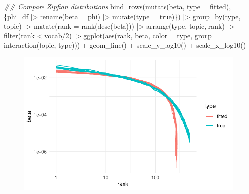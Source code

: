 \documentclass[
]{article}
\newenvironment{Shaded}{\begin{snugshade}}{\end{snugshade}}
\newcommand{\AttributeTok}[1]{\textcolor[rgb]{0.40,0.45,0.13}{#1}}
\newcommand{\DecValTok}[1]{\textcolor[rgb]{0.68,0.00,0.00}{#1}}
\newcommand{\DocumentationTok}[1]{\textcolor[rgb]{0.37,0.37,0.37}{\textit{#1}}}
\newcommand{\FunctionTok}[1]{\textcolor[rgb]{0.28,0.35,0.67}{#1}}
\newcommand{\NormalTok}[1]{\textcolor[rgb]{0.00,0.23,0.31}{#1}}
\newcommand{\SpecialCharTok}[1]{\textcolor[rgb]{0.37,0.37,0.37}{#1}}
\newcommand{\StringTok}[1]{\textcolor[rgb]{0.13,0.47,0.30}{#1}}
\begin{document}
\begin{Shaded}
\begin{Highlighting}[]
\DocumentationTok{\#\# Compare Zipfian distributions}
\FunctionTok{bind\_rows}\NormalTok{(}\FunctionTok{mutate}\NormalTok{(beta, }\AttributeTok{type =} \StringTok{\textquotesingle{}fitted\textquotesingle{}}\NormalTok{), }
\NormalTok{          \{phi\_df }\SpecialCharTok{|\textgreater{}} 
                  \FunctionTok{rename}\NormalTok{(}\AttributeTok{beta =}\NormalTok{ phi) }\SpecialCharTok{|\textgreater{}} 
                  \FunctionTok{mutate}\NormalTok{(}\AttributeTok{type =} \StringTok{\textquotesingle{}true\textquotesingle{}}\NormalTok{)\}) }\SpecialCharTok{|\textgreater{}}
    \FunctionTok{group\_by}\NormalTok{(type, topic) }\SpecialCharTok{|\textgreater{}}
    \FunctionTok{mutate}\NormalTok{(}\AttributeTok{rank =} \FunctionTok{rank}\NormalTok{(}\FunctionTok{desc}\NormalTok{(beta))) }\SpecialCharTok{|\textgreater{}}
    \FunctionTok{arrange}\NormalTok{(type, topic, rank) }\SpecialCharTok{|\textgreater{}}
    \FunctionTok{filter}\NormalTok{(rank }\SpecialCharTok{\textless{}}\NormalTok{ vocab}\SpecialCharTok{/}\DecValTok{2}\NormalTok{) }\SpecialCharTok{|\textgreater{}}
    \FunctionTok{ggplot}\NormalTok{(}\FunctionTok{aes}\NormalTok{(rank, beta, }
               \AttributeTok{color =}\NormalTok{ type, }
               \AttributeTok{group =} \FunctionTok{interaction}\NormalTok{(topic, type))) }\SpecialCharTok{+}
    \FunctionTok{geom\_line}\NormalTok{() }\SpecialCharTok{+}
    \FunctionTok{scale\_y\_log10}\NormalTok{() }\SpecialCharTok{+}
    \FunctionTok{scale\_x\_log10}\NormalTok{()}
\end{Highlighting}
\end{Shaded}

\begin{figure}[H]

{\centering \includegraphics{paper_files/figure-pdf/unnamed-chunk-16-1.pdf}

}

\end{figure}
\end{document}
